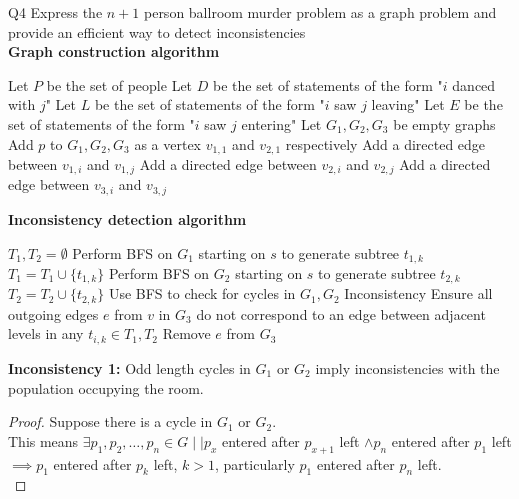 \begin{problem}
  {Q4} Express the $n+1$ person ballroom murder problem as a graph problem and provide an efficient way to detect inconsistencies \\
  \textbf{Graph construction algorithm}
  \begin{algorithmic}[1]
    \STATE Let $P$ be the set of people
    \STATE Let $D$ be the set of statements of the form "$i$ danced with $j$"
    \STATE Let $L$ be the set of statements of the form "$i$ saw $j$ leaving"
    \STATE Let $E$ be the set of statements of the form "$i$ saw $j$ entering"
    \STATE Let $G_1, G_2, G_3$ be empty graphs
    \STATE Add $p$ to $G_1, G_2, G_3$ as a vertex $v_{1,1}$ and $v_{2,1}$ respectively
    \ENDFOR
    \STATE Add a directed edge between $v_{1, i}$ and $v_{1, j}$
    \ENDFOR
    \STATE Add a directed edge between $v_{2, i}$ and $v_{2, j}$
    \ENDFOR
    \STATE Add a directed edge between $v_{3, i}$ and $v_{3, j}$
    \ENDFOR
  \end{algorithmic}
  \textbf{Inconsistency detection algorithm}
  \begin{algorithmic}[1]
    \STATE $T_1, T_2 = \emptyset$
    \STATE Perform BFS on $G_1$ starting on $s$ to generate subtree $t_{1, k}$
    \STATE $T_1 = T_1 \cup \{t_{1, k}\}$
    \ENDWHILE
    \STATE Perform BFS on $G_2$ starting on $s$ to generate subtree $t_{2, k}$
    \STATE $T_2 = T_2 \cup \{t_{2, k}\}$
    \ENDWHILE
    \STATE Use BFS to check for cycles in $G_1, G_2$
    \STATE Inconsistency
    \ENDIF
    \STATE Ensure all outgoing edges $e$ from $v$ in $G_3$ do not correspond to an edge between adjacent levels in any $t_{i, k} \in T_1, T_2$
    \STATE Remove $e$ from $G_3$
    \ENDFOR
  \end{algorithmic}
  \textbf{Inconsistency 1: } Odd length cycles in $G_1$ or $G_2$ imply inconsistencies with the population occupying the room. \\
  \begin{proof}
    Suppose there is a cycle in $G_1$ or $G_2$. \\
    This means $\exists p_1, p_2, \dots, p_n \in G \mid| p_x$ entered after $p_{x+1}$ left $\land p_{n} $ entered after $p_1$ left \\
    $\implies p_1$ entered after $p_k$ left, $k > 1$, particularly $p_1$ entered after $p_n$ left. \\

\end{proof}
\end{problem}
